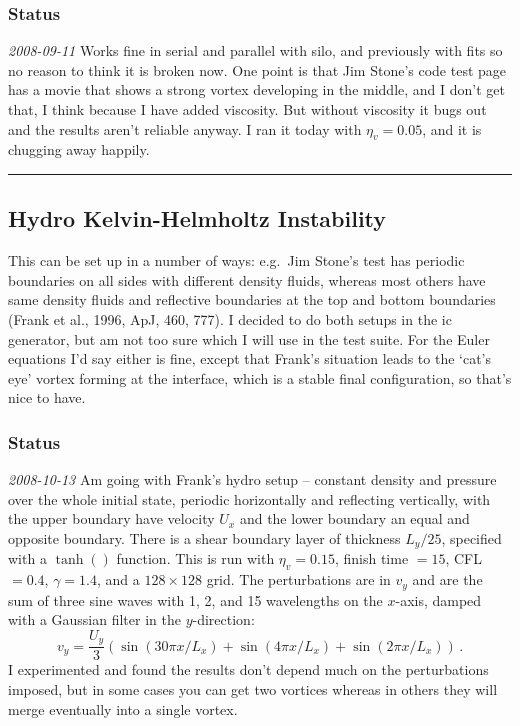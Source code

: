 \documentclass[11pt]{article}
\begin{document}
\subsubsection{Status}
\textit{2008-09-11} Works fine in serial and parallel with silo, and
previously with fits so no reason to think it is broken now.  One
point is that Jim Stone's code test page has a movie that shows a
strong vortex developing in the middle, and I don't get that, I think
because I have added viscosity.  But without viscosity it bugs out and
the results aren't reliable anyway.  I ran it today with
$\eta_v=0.05$, and it is chugging away happily.

\vspace{0.4cm} \hrule
\subsection{Hydro Kelvin-Helmholtz Instability}
This can be set up in a number of ways: e.g.\ Jim Stone's test has
periodic boundaries on all sides with different density fluids,
whereas most others have same density fluids and reflective boundaries
at the top and bottom boundaries (Frank et al., 1996, ApJ, 460, 777).
I decided to do both setups in the ic generator, but am not too sure
which I will use in the test suite.  For the Euler equations I'd say
either is fine, except that Frank's situation leads to the `cat's eye'
vortex forming at the interface, which is a stable final
configuration, so that's nice to have.
\subsubsection{Status}
\textit{2008-10-13} Am going with Frank's hydro setup -- constant
density and pressure over the whole initial state, periodic
horizontally and reflecting vertically, with the upper boundary have
velocity $U_x$ and the lower boundary an equal and opposite boundary.
There is a shear boundary layer of thickness $L_y/25$, specified with
a $\tanh()$ function.  This is run with $\eta_v=0.15$, finish time
$=15$, CFL$=0.4$, $\gamma=1.4$, and a $128\times128$ grid.  The
perturbations are in $v_y$ and are the sum of three sine waves with 1,
2, and 15 wavelengths on the $x$-axis, damped with a Gaussian filter
in the $y$-direction:
\[ v_y = \frac{U_y}{3}\left( \sin(30\pi x/L_x) + \sin(4\pi x/L_x) +
  \sin(2\pi x/L_x) \right)\,. \]
I experimented and found the results don't depend much on the
perturbations imposed, but in some cases you can get two vortices
whereas in others they will merge eventually into a single vortex.
\end{document}

